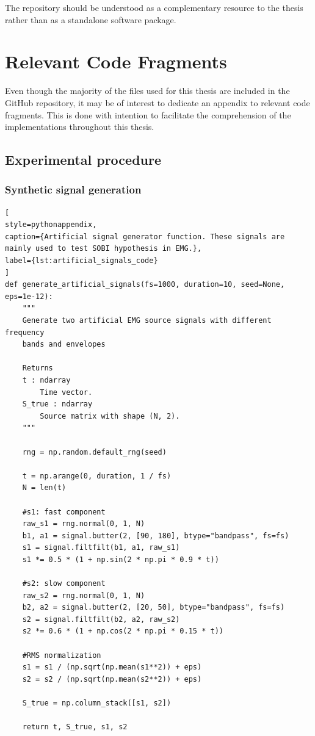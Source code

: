 The repository should be understood as a complementary resource to the thesis rather than as a standalone software package.

\chapter{Relevant Code Fragments}
\label{app:code}
Even though the majority of the files used for this thesis are included in the GitHub repository, it may be of interest to dedicate an appendix to relevant code fragments. This is done with intention to facilitate the comprehension of the implementations throughout this thesis. 
\section{Experimental procedure}
\subsection{Synthetic signal generation}
\label{app:synthetic_signals}
\begin{lstlisting}[
style=pythonappendix,
caption={Artificial signal generator function. These signals are mainly used to test SOBI hypothesis in EMG.},
label={lst:artificial_signals_code}
]
def generate_artificial_signals(fs=1000, duration=10, seed=None, eps=1e-12):
    """
    Generate two artificial EMG source signals with different frequency
    bands and envelopes

    Returns
    t : ndarray
        Time vector.
    S_true : ndarray
        Source matrix with shape (N, 2).
    """

    rng = np.random.default_rng(seed)

    t = np.arange(0, duration, 1 / fs)
    N = len(t)

    #s1: fast component
    raw_s1 = rng.normal(0, 1, N)
    b1, a1 = signal.butter(2, [90, 180], btype="bandpass", fs=fs)
    s1 = signal.filtfilt(b1, a1, raw_s1)
    s1 *= 0.5 * (1 + np.sin(2 * np.pi * 0.9 * t))

    #s2: slow component
    raw_s2 = rng.normal(0, 1, N)
    b2, a2 = signal.butter(2, [20, 50], btype="bandpass", fs=fs)
    s2 = signal.filtfilt(b2, a2, raw_s2)
    s2 *= 0.6 * (1 + np.cos(2 * np.pi * 0.15 * t))

    #RMS normalization
    s1 = s1 / (np.sqrt(np.mean(s1**2)) + eps)
    s2 = s2 / (np.sqrt(np.mean(s2**2)) + eps)

    S_true = np.column_stack([s1, s2])

    return t, S_true, s1, s2
\end{lstlisting}

